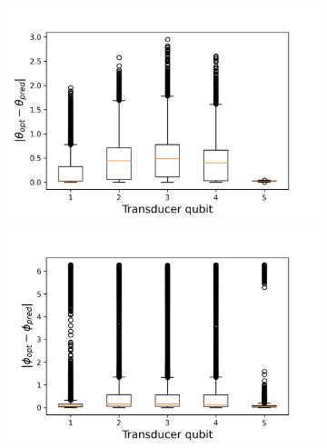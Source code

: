 \begin{figure}[h]
\begin{subfigure}{0.45\textwidth}
	\end{subfigure}
	\begin{subfigure}{0.45\textwidth}
		\centering
		\includegraphics[width=\textwidth]{img/delta_theta_box2}
	\end{subfigure}
\begin{subfigure}{0.45\textwidth}
	\centering
	\includegraphics[width=\textwidth]{img/delta_phi_box2}
\end{subfigure}

\end{figure}
